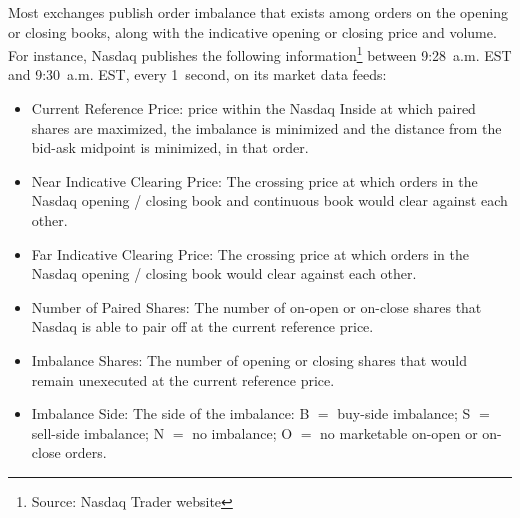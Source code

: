 Most exchanges publish order imbalance that exists among orders on the opening or closing books, along with the indicative opening or closing price and volume. For instance, Nasdaq publishes the following information\footnote{Source: Nasdaq Trader website} between 9:28~a.m. EST and 9:30~a.m. EST,  every 1~second, on its market data feeds:
        \begin{itemize}
        \item  Current Reference Price: price within the Nasdaq Inside at which paired shares are maximized, the imbalance is minimized and the distance from the bid-ask midpoint is minimized, in that order.
        \item  Near Indicative Clearing Price: The crossing price at which orders in the Nasdaq opening / closing book and continuous book would clear against each other. 
        \item  Far Indicative Clearing Price: The crossing price at which orders in the Nasdaq opening / closing book would clear against each other. 
        \item  Number of Paired Shares: The number of on-open or on-close shares that Nasdaq is able to pair off at the current reference price. 
        \item  Imbalance Shares: The number of opening or closing shares that would remain unexecuted at the current reference price. 
        \item  Imbalance Side: The side of the imbalance: B $=$ buy-side imbalance; S $=$ sell-side imbalance; N $=$ no imbalance; O $=$ no marketable on-open or on-close orders.
        \end{itemize}


